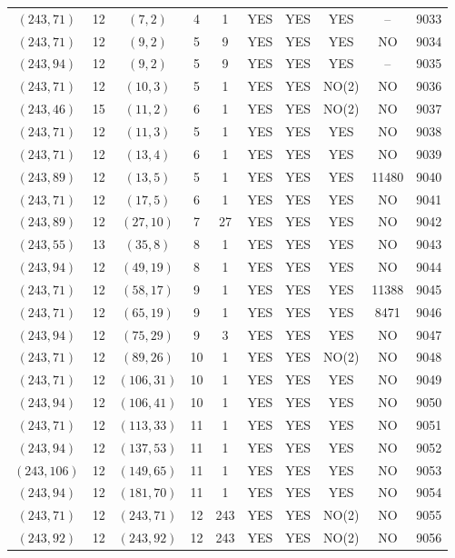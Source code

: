 \begin{longtable}{|c|c|c|c|c|c|c|c|c|c|}
$(243, 71)$ & 12 & $(7, 2)$ & 4 & 1 & YES & YES & YES & -- & 9033\\
$(243, 71)$ & 12 & $(9, 2)$ & 5 & 9 & YES & YES & YES & NO & 9034\\
$(243, 94)$ & 12 & $(9, 2)$ & 5 & 9 & YES & YES & YES & -- & 9035\\
$(243, 71)$ & 12 & $(10, 3)$ & 5 & 1 & YES & YES & NO(2) & NO & 9036\\
$(243, 46)$ & 15 & $(11, 2)$ & 6 & 1 & YES & YES & NO(2) & NO & 9037\\
$(243, 71)$ & 12 & $(11, 3)$ & 5 & 1 & YES & YES & YES & NO & 9038\\
$(243, 71)$ & 12 & $(13, 4)$ & 6 & 1 & YES & YES & YES & NO & 9039\\
$(243, 89)$ & 12 & $(13, 5)$ & 5 & 1 & YES & YES & YES & 11480 & 9040\\
$(243, 71)$ & 12 & $(17, 5)$ & 6 & 1 & YES & YES & YES & NO & 9041\\
$(243, 89)$ & 12 & $(27, 10)$ & 7 & 27 & YES & YES & YES & NO & 9042\\
$(243, 55)$ & 13 & $(35, 8)$ & 8 & 1 & YES & YES & YES & NO & 9043\\
$(243, 94)$ & 12 & $(49, 19)$ & 8 & 1 & YES & YES & YES & NO & 9044\\
$(243, 71)$ & 12 & $(58, 17)$ & 9 & 1 & YES & YES & YES & 11388 & 9045\\
$(243, 71)$ & 12 & $(65, 19)$ & 9 & 1 & YES & YES & YES & 8471 & 9046\\
$(243, 94)$ & 12 & $(75, 29)$ & 9 & 3 & YES & YES & YES & NO & 9047\\
$(243, 71)$ & 12 & $(89, 26)$ & 10 & 1 & YES & YES & NO(2) & NO & 9048\\
$(243, 71)$ & 12 & $(106, 31)$ & 10 & 1 & YES & YES & YES & NO & 9049\\
$(243, 94)$ & 12 & $(106, 41)$ & 10 & 1 & YES & YES & YES & NO & 9050\\
$(243, 71)$ & 12 & $(113, 33)$ & 11 & 1 & YES & YES & YES & NO & 9051\\
$(243, 94)$ & 12 & $(137, 53)$ & 11 & 1 & YES & YES & YES & NO & 9052\\
$(243, 106)$ & 12 & $(149, 65)$ & 11 & 1 & YES & YES & YES & NO & 9053\\
$(243, 94)$ & 12 & $(181, 70)$ & 11 & 1 & YES & YES & YES & NO & 9054\\
$(243, 71)$ & 12 & $(243, 71)$ & 12 & 243 & YES & YES & NO(2) & NO & 9055\\
$(243, 92)$ & 12 & $(243, 92)$ & 12 & 243 & YES & YES & NO(2) & NO & 9056\\

\end{longtable}

